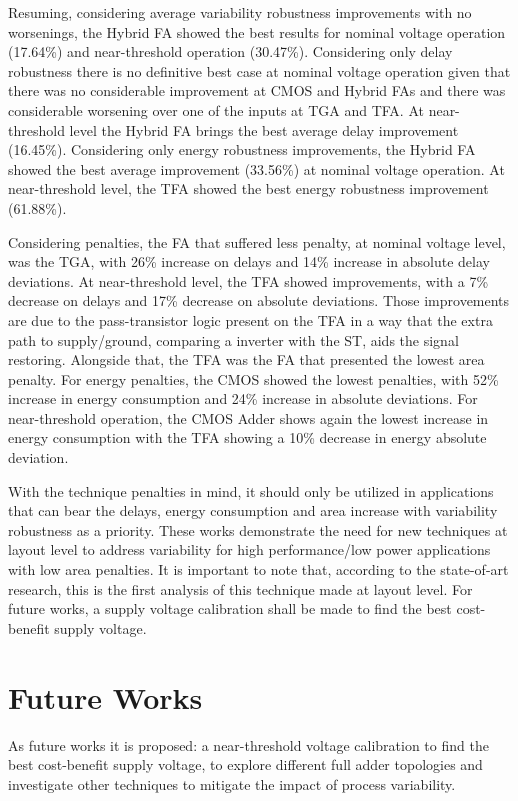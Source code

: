 \documentclass[ecp,tc, english]{iiufrgs}
\begin{document}
Resuming, considering average variability robustness improvements with no worsenings, the Hybrid FA showed the best results for nominal voltage operation (17.64\%) and near-threshold operation (30.47\%). Considering only delay robustness there is no definitive best case at nominal voltage operation given that there was no considerable improvement at CMOS and Hybrid FAs and there was considerable worsening over one of the inputs at TGA and TFA. At near-threshold level the Hybrid FA brings the best average delay improvement (16.45\%). Considering only energy robustness improvements, the Hybrid FA showed the best average improvement (33.56\%) at nominal voltage operation. At near-threshold level, the TFA showed the best energy robustness improvement (61.88\%).

Considering penalties, the FA that suffered less penalty, at nominal voltage level, was the TGA, with 26\% increase on delays and 14\% increase in absolute delay deviations. At near-threshold level, the TFA showed improvements, with a 7\% decrease on delays and 17\% decrease on absolute deviations. Those improvements are due to the pass-transistor logic present on the TFA in a way that the extra path to supply/ground, comparing a inverter with the ST, aids the signal restoring. Alongside that, the TFA was the FA that presented the lowest area penalty. For energy penalties, the CMOS showed the lowest penalties, with 52\% increase in energy consumption and 24\% increase in absolute deviations. For near-threshold operation, the CMOS Adder shows again the lowest increase in energy consumption with the TFA showing a 10\% decrease in energy absolute deviation.

With the technique penalties in mind, it should only be utilized in applications that can bear the delays, energy consumption and area increase with variability robustness as a priority. These works demonstrate the need for new techniques at layout level to address variability for high performance/low power applications with low area penalties. It is important to note that, according to the state-of-art research, this is the first analysis of this technique made at layout level. For future works, a supply voltage calibration shall be made to find the best cost-benefit supply voltage.

\section{Future Works}

As future works it is proposed: a near-threshold voltage calibration to find the best cost-benefit supply voltage, to explore different full adder topologies and investigate other techniques to mitigate the impact of process variability.
\end{document}
